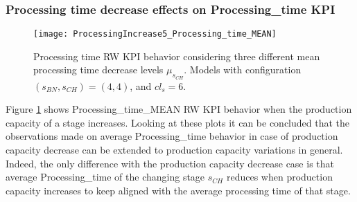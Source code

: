 \subsubsection{Processing time decrease effects on Processing\_time KPI}
\begin{figure}[h] 
\centering
\texttt{[image: ProcessingIncrease5\_Processing\_time\_MEAN]}
\caption[Processing time RW KPI behavior with different processing time decrease levels]{Processing time RW KPI behavior considering three different mean processing time decrease levels $\mu_{s_{CH}}$. Models with configuration $(s_{BN},s_{CH})=(4,4)$, and $cl_s=6$.}
\label{fig:Processing time RW KPI behavior with different processing time decrease levels}
\end{figure}
Figure \ref{fig:Processing time RW KPI behavior with different processing time decrease levels} shows Processing\_time\_MEAN RW KPI behavior when the production capacity of a stage increases. Looking at these plots it can be concluded that the observations made on average Processing\_time behavior in case of production capacity decrease can be extended to production capacity variations in general. Indeed, the only difference with the production capacity decrease case is that average Processing\_time of the changing stage $s_{CH}$ reduces when production capacity increases to keep aligned with the average processing time of that stage.
